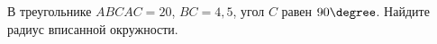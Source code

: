 \begin{ex}
	\begin{condition}
		В треугольнике \( ABC AC = 20 \), \( BC = 4,5 \), угол \( C \) равен \( 90\degree\). Найдите радиус вписанной окружности.
	\end{condition}
\end{ex}